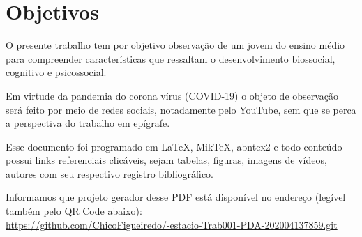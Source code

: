\chapter{Objetivos}

O presente trabalho tem por objetivo observação de um jovem do ensino médio para compreender características  que ressaltam o  desenvolvimento biossocial, cognitivo e psicossocial.

Em virtude da pandemia do corona vírus (COVID-19) o objeto de observação será feito por meio de redes sociais, notadamente pelo YouTube, sem que se perca a perspectiva do trabalho em epígrafe.

Esse documento foi programado em \LaTeX, MikTeX, abntex2 e todo conteúdo possui links referenciais clicáveis, sejam tabelas, figuras, imagens de vídeos, autores com seu respectivo registro bibliográfico.

Informamos que projeto gerador desse PDF está disponível no endereço (legível também pelo QR Code abaixo): \\
\url{https://github.com/ChicoFigueiredo/-estacio-Trab001-PDA-202004137859.git} \\
\begin{center}
    \href{https://github.com/ChicoFigueiredo/-estacio-Trab001-PDA-202004137859.git}{
    }
\end{center}


